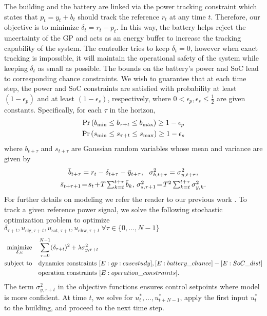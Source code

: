 The building and the battery are linked via the power tracking constraint which states that \(p_t = y_t + b_t\) should track the reference \(r_t\) at any time \(t\). Therefore, our objective is to minimize \(\delta_t = r_t - p_t\).
In this way, the battery helps reject the uncertainty of the GP and acts as an energy buffer to increase the tracking capability of the system. 
The controller tries to keep \(\delta_t = 0\), however when exact tracking is impossible, it will maintain the operational safety of the system while keeping \(\delta_t\)  as small as possible.
The bounds on the battery's power and SoC lead to corresponding chance constraints.
We wish to guarantee that at each time step, the power and SoC constraints are satisfied with probability at least \((1 - \epsilon_p)\) and  at least \((1 - \epsilon_s)\), respectively, where \(0 < \epsilon_p, \epsilon_s \leq \frac{1}{2}\) are given constants.
Specifically, for each \(\tau\) in the horizon,
	\begin{gather}
	\label{E:battery_chance}
	\Pr\left( \Pbmin \leq b_{\tau+t}\leq \Pbmax \right) \geq 1 - \epsilon_p  \\
	\label{E:SoC_chance}
	\Pr\left( \SOCmin \leq s_{\tau+t} \leq \SOCmax \right) \geq 1 - \epsilon_s 
	\end{gather}
where \(b_{t+\tau}\) and \(s_{t+\tau}\) are Gaussian random variables whose mean and variance are given by
\begin{gather}
\bar{b}_{t+\tau}= r_{t} - \delta_{t+\tau} - \bar{y}_{t+\tau}, \ \ 
\sigma^2_{b,t+\tau} =  \sigma^2_{y,t+\tau} \text, \label{E:battery_dist} \\
\bar{s}_{t+\tau+1}\!=\! s_t \!+\! T \textstyle\sum_{k=t}^{t+\tau} \bar{\Pbatt}_{k}, \,
\sigma^2_{s,\tau+1} \!=\! T^2 \textstyle\sum_{k=t}^{t+\tau} \sigma^2_{y,k} \text. \label{E:SoC_dist}
\end{gather}
For further details on modeling we refer the reader to our previous work \cite{nghiemetal16gp}.
To track a given reference power signal, we solve the following stochastic optimization problem to optimize \(\delta_{\tau+t},u_{\mathrm{clg},\tau+t},u_{\mathrm{sat},\tau+t},u_{\mathrm{chw},\tau+t} \ \forall \tau \in \{0,\dots,N-1\}\)
\begin{align}
\label{E:casestudy:mpc}
\minimize_{\delta, u} \quad & \sum_{\tau=0}^{N-1} (\delta_{\tau+t})^2 + \lambda \sigma_{y,\tau+t}^2\\
\st \quad & \text{dynamics constraints } \eqref{E:gp:casestudy}, \eqref{E:battery_chance} - \eqref{E:SoC_dist} \nonumber \\
&  \text{operation constraints } \eqref{E:operation_constraints}. \nonumber
\end{align}
The term \( \sigma_{y,\tau+t}^2\) in the objective functions ensures control setpoints where model is more confident.
At time \(t\), we solve for \(u^*_{t},\dots,u^*_{t+N-1} \), apply the first input \(u^*_{t} \) to the building, and proceed to the next time step.

